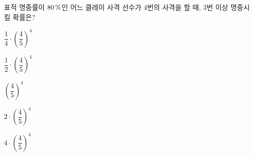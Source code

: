 표적 명중률이 $80\mkern3mu \%$인 어느 클레이 사격 선수가 4번의 사격을 할 때, 3번 이상 명중시킬 확률은? 
\begin{choicesii}{\rule[-3ex]{0pt}{8ex}$\dfrac{1}{4}\cdot\left(\dfrac{4}{5}\right)^4$}{\rule[-3ex]{0pt}{8ex}$\dfrac{1}{2}\cdot\left(\dfrac{4}{5}\right)^4$}{\rule[-3ex]{0pt}{8ex}$\left(\dfrac{4}{5}\right)^4$}{\rule[-3ex]{0pt}{8ex}$2\cdot\left(\dfrac{4}{5}\right)^4$}{\rule[-3ex]{0pt}{8ex}$4\cdot\left(\dfrac{4}{5}\right)^4$}\end{choicesii}
